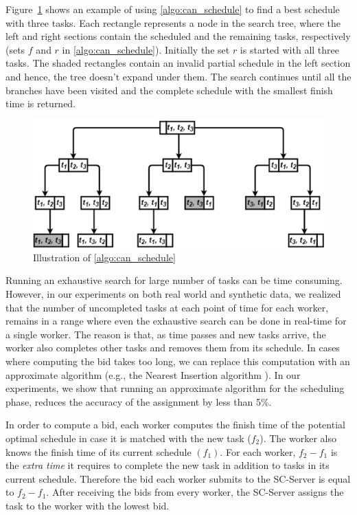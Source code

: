 Figure~\ref{fig:bAndb} shows an example of using \cref{algo:can_schedule} to find a best schedule with three tasks. Each rectangle represents a node in the search tree, where the left and right sections contain the scheduled and the remaining tasks, respectively (sets $f$ and $r$ in \cref{algo:can_schedule}). Initially the set $r$ is started with all three tasks. The shaded rectangles contain an invalid partial schedule in the left section and hence, the tree doesn't expand under them. The search continues until all the branches have been visited and the complete schedule with the smallest finish time is returned.

\begin{figure}[!ht]
	\centering
	\includegraphics[width=0.95\columnwidth]{figures/bAndb}
	\vspace{-0mm}\caption{Illustration of \cref{algo:can_schedule}} \vspace{-2mm} \label{fig:bAndb}
\end{figure}\vspace{-0mm}

Running an exhaustive search for large number of tasks can be time consuming. However, in our experiments on both real world and synthetic data, we realized that the number of uncompleted tasks at each point of time for each worker, remains in a range where even the exhaustive search can be done in real-time for a single worker. The reason is that, as time passes and new tasks arrive, the worker also completes other tasks and removes them from its schedule. In cases where computing the bid takes too long, we can replace this computation with an approximate algorithm (e.g., the Nearest Insertion algorithm \cite{Rosenkrantz74}). In our experiments, we show that running an approximate algorithm for the scheduling phase, reduces the accuracy of the assignment by less than 5\%. 

In order to compute a bid, each worker computes the finish time of the potential optimal schedule in case it is matched with the new task ($f_2$). The worker also knows the finish time of its current schedule $(f_1)$. For each worker, $f_2-f_1$ is the \textit{extra time} it requires to complete the new task in addition to tasks in its current schedule. Therefore the bid each worker submits to the SC-Server is equal to $f_2 - f_1$. After receiving the bids from every worker, the SC-Server assigns the task to the worker with the lowest bid.

